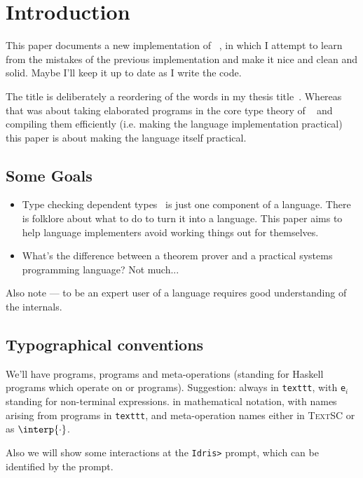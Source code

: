 \section{Introduction}

This paper documents a new implementation of \Idris{}~\cite{Brady2011a}, in which
I attempt to learn from the mistakes of the previous implementation and make
it nice and clean and solid. Maybe I'll keep it up to date as I write the
code.

The title is deliberately a reordering of the words in my thesis
title~\cite{Brady2005}. Whereas that was about taking elaborated programs
in the core type theory of \Epigram{}~\cite{McBride2004a} and compiling them
efficiently (i.e. making the language implementation practical) this paper is
about making the language itself practical. 

\subsection{Some Goals}

\begin{itemize}
\item Type checking dependent types~\cite{Chapman2005epigram,loh2010tutorial} is just one component
 of a language. There is folklore about what to do to turn it into a language. This
 paper aims to help language implementers avoid working things out for themselves.
\item What's the difference between a theorem prover and a practical systems programming
 language? Not much...
\end{itemize}

Also note --- to be an expert user of a language requires good understanding of the internals.

\subsection{Typographical conventions}

We'll have \Idris{} programs, \TT{} programs and meta-operations (standing for
Haskell programs which operate on \Idris{} or \TT{} programs). Suggestion:
\Idris{} always in \texttt{texttt}, with \texttt{e$_i$} standing for
non-terminal expressions.  \TT{} in mathematical notation, with names arising
from \Idris{} programs in \texttt{texttt}, and meta-operation
names either in \textsc{TextSC} or as $\interp{\cdot}$.

Also we will show some interactions at the \texttt{Idris>} prompt, which can be identified
by the prompt.
